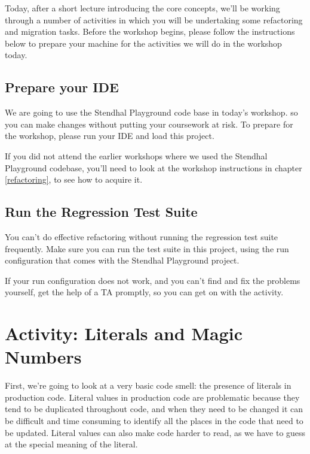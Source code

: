 \documentclass[
]{book}
\begin{document}
Today, after a short lecture introducing the core concepts, we'll be working through a number of activities in which you will be undertaking some refactoring and migration tasks. Before the workshop begins, please follow the instructions below to prepare your machine for the activities we will do in the workshop today.

\hypertarget{prepide}{%
\subsection{Prepare your IDE}\label{prepide}}

We are going to use the Stendhal Playground code base in today's workshop. so you can make changes without putting your coursework at risk. To prepare for the workshop, please run your IDE and load this project.

If you did not attend the earlier workshops where we used the Stendhal Playground codebase, you'll need to look at the workshop instructions in chapter \ref{refactoring}, to see how to acquire it.

\hypertarget{testsuite}{%
\subsection{Run the Regression Test Suite}\label{testsuite}}

You can't do effective refactoring without running the regression test suite frequently. Make sure you can run the test suite in this project, using the run configuration that comes with the Stendhal Playground project.

If your run configuration does not work, and you can't find and fix the problems yourself, get the help of a TA promptly, so you can get on with the activity.

\hypertarget{magic}{%
\section{Activity: Literals and Magic Numbers}\label{magic}}

First, we're going to look at a very basic code smell: the presence of literals in production code. Literal values in production code are problematic because they tend to be duplicated throughout code, and when they need to be changed it can be difficult and time consuming to identify all the places in the code that need to be updated. Literal values can also make code harder to read, as we have to guess at the special meaning of the literal.
\end{document}
